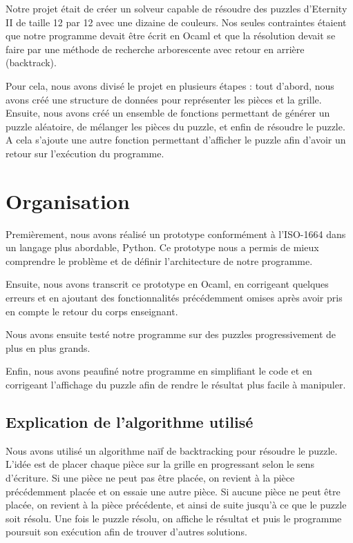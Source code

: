 \documentclass[12pt, openany]{report}
\begin{document}
Notre projet était de créer un solveur capable de résoudre des
puzzles d’Eternity II de taille 12 par 12 avec une dizaine de
couleurs. Nos seules contraintes étaient que notre programme devait
être écrit en Ocaml et que la résolution devait se faire par une
méthode de recherche arborescente avec retour en arrière (backtrack).

Pour cela, nous avons divisé le projet en plusieurs étapes :
tout d’abord, nous avons créé une structure de données pour
représenter les pièces et la grille. Ensuite, nous avons créé un
ensemble de fonctions permettant de générer un puzzle aléatoire,
de mélanger les pièces du puzzle, et enfin de résoudre le puzzle.
A cela s’ajoute une autre fonction permettant d'afficher le puzzle
afin d'avoir un retour sur l'exécution du programme.

\section*{Organisation}

Premièrement, nous avons réalisé un prototype conformément à
l'ISO-1664 dans un langage plus abordable, Python. Ce prototype
nous a permis de mieux comprendre le problème et de définir
l'architecture de notre programme.

Ensuite, nous avons transcrit ce prototype en Ocaml, en corrigeant
quelques erreurs et en ajoutant des fonctionnalités précédemment
omises après avoir pris en compte le retour du corps enseignant.

Nous avons ensuite testé notre programme sur des puzzles
progressivement de plus en plus grands.

Enfin, nous avons peaufiné notre programme en simplifiant le code
et en corrigeant l'affichage du puzzle afin de rendre le résultat
plus facile à manipuler.

\subsection*{Explication de l'algorithme utilisé}

Nous avons utilisé un algorithme naïf de backtracking pour résoudre
le puzzle. L’idée est de placer chaque pièce sur la grille en
progressant selon le sens d’écriture. Si une pièce ne peut pas être
placée, on revient à la pièce précédemment placée et on essaie une
autre pièce. Si aucune pièce ne peut être placée, on revient à la
pièce précédente, et ainsi de suite jusqu’à ce que le puzzle soit
résolu. Une fois le puzzle résolu, on affiche le résultat et puis
le programme poursuit son exécution afin de trouver d'autres
solutions. 
\end{document}
